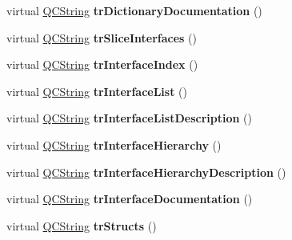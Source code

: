 \begin{DoxyCompactItemize}
\mbox{\label{class_translator_english_a648e08810186a757cf87013f3a5eddee}} 
virtual \mbox{\hyperlink{class_q_c_string}{Q\+C\+String}} {\bfseries tr\+Dictionary\+Documentation} ()
\item 
\mbox{\label{class_translator_english_a8796263d8f61c8a0e7d477e42f6300c5}} 
virtual \mbox{\hyperlink{class_q_c_string}{Q\+C\+String}} {\bfseries tr\+Slice\+Interfaces} ()
\item 
\mbox{\label{class_translator_english_a1ea7b177b17ddd4ad50b70f414bea762}} 
virtual \mbox{\hyperlink{class_q_c_string}{Q\+C\+String}} {\bfseries tr\+Interface\+Index} ()
\item 
\mbox{\label{class_translator_english_a0f36411f5837e6fbd69c8ae2319f6fdb}} 
virtual \mbox{\hyperlink{class_q_c_string}{Q\+C\+String}} {\bfseries tr\+Interface\+List} ()
\item 
\mbox{\label{class_translator_english_a53ebdd155130bf251ebe9284f7a85e64}} 
virtual \mbox{\hyperlink{class_q_c_string}{Q\+C\+String}} {\bfseries tr\+Interface\+List\+Description} ()
\item 
\mbox{\label{class_translator_english_a8d6271b834be2a118cdee362a68def50}} 
virtual \mbox{\hyperlink{class_q_c_string}{Q\+C\+String}} {\bfseries tr\+Interface\+Hierarchy} ()
\item 
\mbox{\label{class_translator_english_a2f85ff9ce1740e811670c58f9e4c954f}} 
virtual \mbox{\hyperlink{class_q_c_string}{Q\+C\+String}} {\bfseries tr\+Interface\+Hierarchy\+Description} ()
\item 
\mbox{\label{class_translator_english_a1a6b6f253832c3a58a30ffac54698db9}} 
virtual \mbox{\hyperlink{class_q_c_string}{Q\+C\+String}} {\bfseries tr\+Interface\+Documentation} ()
\item 
\mbox{\label{class_translator_english_ad21bdf986e5ebfe2a29e70a4f8b67596}} 
virtual \mbox{\hyperlink{class_q_c_string}{Q\+C\+String}} {\bfseries tr\+Structs} ()
\item 

\end{DoxyCompactItemize}
